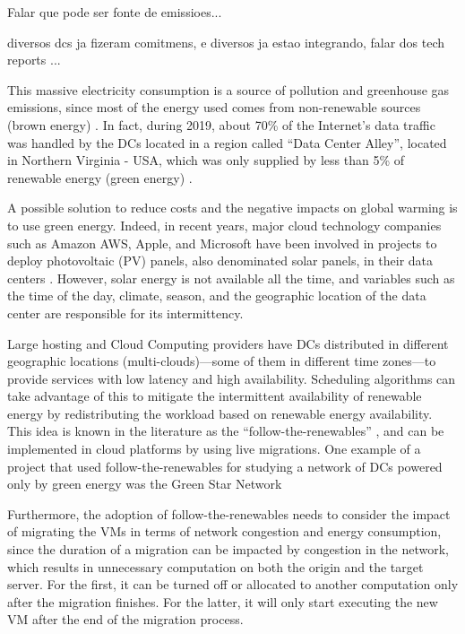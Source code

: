 
Falar que pode ser fonte de emissioes...

diversos dcs ja fizeram comitmens, e diversos ja estao integrando, falar dos tech reports ...


This massive electricity consumption is a source of pollution and greenhouse gas emissions, since most of the energy used comes from non-renewable sources (brown energy) \citep{greenpeace2017}. In fact, during 2019, about 70\% of the Internet's data traffic was handled by the DCs located in a region called ``Data Center Alley'', located in Northern Virginia - USA, which was only supplied by less than 5\% of renewable energy (green energy)  \citep{clicking_clean_virginia}.


A possible solution to reduce costs and the negative impacts on global warming is to use green energy. Indeed, in recent years, major cloud technology companies such as Amazon AWS, Apple, and Microsoft have been involved in projects to deploy photovoltaic (PV) panels, also denominated solar panels,  in their data centers \citep{greenpeace2017}. However, solar energy is not available all the time, and variables such as the time of the day, climate, season, and the geographic location of the data center are responsible for its intermittency.


Large hosting and Cloud Computing providers have DCs distributed in different geographic locations (multi-clouds)---some of them in different time zones---to provide services with low latency and high availability. Scheduling algorithms can take advantage of this to mitigate the intermittent availability of renewable energy by redistributing the workload based on renewable energy availability. This idea is known in the literature as the ``follow-the-renewables'' \cite{shuja2016sustainable}, and can be implemented in cloud platforms by using live migrations. One example of a project that used follow-the-renewables for studying a network of DCs powered only by green energy was the Green Star Network %

Furthermore, the adoption of follow-the-renewables needs to consider the impact of migrating the VMs in terms of network congestion and energy consumption, since the duration of a migration can be impacted by congestion in the network, which results in unnecessary computation on both the origin and the target server. For the first, it can be turned off or allocated to another computation only after the migration finishes. For the latter, it will only start executing the new VM after the end of the migration process.



